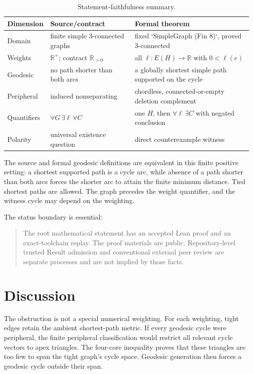 \documentclass[11pt]{amsart}
\theoremstyle{definition}
\begin{document}
\begin{table}[ht]
\centering\small
\caption{Statement-faithfulness summary.}\label{tab:faith}
\begin{tabular}{@{}p{}p{}p{}@{}}
\toprule
Dimension & Source/contract & Formal theorem \\
\midrule
Domain & finite simple $3$-connected graphs & fixed `SimpleGraph (Fin 8)`, proved $3$-connected \\
Weights & $\mathbb R^+$; contract $\mathbb R_{>0}$ & all $\ell:E(H)\to\mathbb R$ with $0<\ell(e)$ \\
Geodesic & no path shorter than both arcs & a globally shortest simple path supported on the cycle \\
Peripheral & induced nonseparating & chordless, connected-or-empty deletion complement \\
Quantifiers & $\forall G\,\exists\ell\,\forall C$ & one $H$, then $\forall\ell\,\exists C$ with negated conclusion \\
Polarity & universal existence question & direct counterexample witness \\
\bottomrule
\end{tabular}
\end{table}

The source and formal geodesic definitions are equivalent in this finite positive setting: a shortest supported path is a cycle arc, while absence of a path shorter than both arcs forces the shorter arc to attain the finite minimum distance.  Tied shortest paths are allowed.  The graph precedes the weight quantifier, and the witness cycle may depend on the weighting.

The status boundary is essential:
\begin{quote}
The root mathematical statement has an accepted Lean proof and an exact-toolchain replay. The proof materials are public. Repository-level trusted Result admission and conventional external peer review are separate processes and are not implied by those facts.
\end{quote}

\section{Discussion}

The obstruction is not a special numerical weighting.  For each weighting, tight edges retain the ambient shortest-path metric.  If every geodesic cycle were peripheral, the finite peripheral classification would restrict all relevant cycle vectors to apex triangles.  The four-core inequality proves that these triangles are too few to span the tight graph's cycle space.  Geodesic generation then forces a geodesic cycle outside their span.
\end{document}
